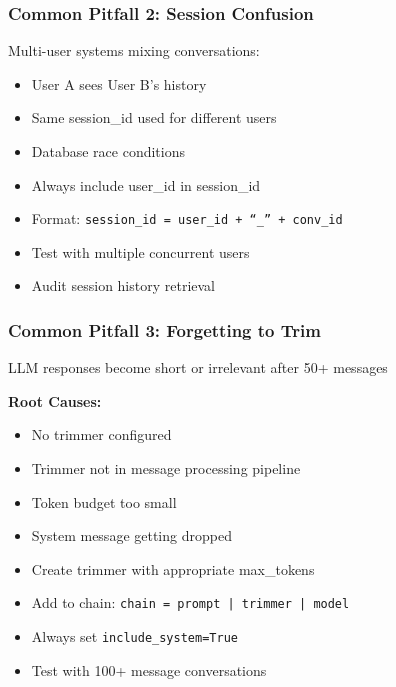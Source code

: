 \documentclass[aspectratio=169,11pt]{beamer}
\begin{document}
\begin{frame}
  \frametitle{Common Pitfall 2: Session Confusion}
  \begin{warningbox}[Problem]
    Multi-user systems mixing conversations:
    \begin{itemize}
      \item User A sees User B's history
      \item Same session\_id used for different users
      \item Database race conditions
    \end{itemize}
  \end{warningbox}
  \vspace{0.6em}
  \begin{tipbox}[Solution]
    \begin{itemize}
      \item Always include user\_id in session\_id
      \item Format: \texttt{session\_id = user\_id + ``\_'' + conv\_id}
      \item Test with multiple concurrent users
      \item Audit session history retrieval
    \end{itemize}
  \end{tipbox}
\end{frame}

\begin{frame}
  \frametitle{Common Pitfall 3: Forgetting to Trim}
  \begin{warningbox}[Symptom]
    LLM responses become short or irrelevant after 50+ messages
  \end{warningbox}
  \vspace{0.6em}
  \textbf{Root Causes:}
  \begin{itemize}
    \item No trimmer configured
    \item Trimmer not in message processing pipeline
    \item Token budget too small
    \item System message getting dropped
  \end{itemize}
  \vspace{0.6em}
  \begin{tipbox}
    \begin{itemize}
      \item \checkmark Create trimmer with appropriate max\_tokens
      \item \checkmark Add to chain: \texttt{chain = prompt | trimmer | model}
      \item \checkmark Always set \texttt{include\_system=True}
      \item \checkmark Test with 100+ message conversations
    \end{itemize}
  \end{tipbox}
\end{frame}
\end{document}
